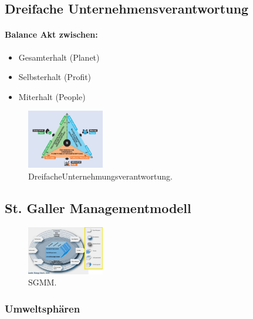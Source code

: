 \documentclass{article}
\begin{document}
\subsection{Dreifache Unternehmensverantwortung}
\paragraph{Balance Akt zwischen:} 

\begin{itemize}
\item Gesamterhalt (Planet)
\item Selbsterhalt (Profit)
\item Miterhalt (People)
\end{itemize}

\begin{figure}[H]
\centering
\includegraphics[width=0.3\textwidth]{Resources/Image/Dreifache Unternehmungsveratntwortung.png}
\caption{\label{fig:DreifacheUnternehmungsverantwortung}DreifacheUnternehmungsverantwortung.}
\end{figure}


\subsection{St. Galler Managementmodell}
\begin{figure}[H]
\centering
\includegraphics [width=0.3\textwidth]{Resources/Image/SGMM.png}
\caption{\label{fig:SGMM}SGMM.}
\end{figure}


\subsubsection{Umweltsphären}
\end{document}
